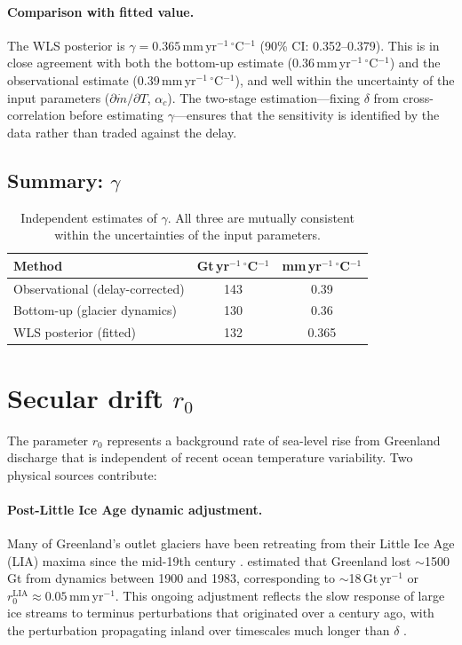 \documentclass[11pt]{article}
\begin{document}
\paragraph{Comparison with fitted value.}
The WLS posterior is $\gamma = 0.365$\,mm\,yr$^{-1}$\,$^\circ$C$^{-1}$ (90\% CI: 0.352--0.379). This is in close agreement with both the bottom-up estimate (0.36\,mm\,yr$^{-1}$\,$^\circ$C$^{-1}$) and the observational estimate (0.39\,mm\,yr$^{-1}$\,$^\circ$C$^{-1}$), and well within the uncertainty of the input parameters ($\partial \dot{m}/\partial T$, $\alpha_c$). The two-stage estimation---fixing $\delta$ from cross-correlation before estimating $\gamma$---ensures that the sensitivity is identified by the data rather than traded against the delay.

\subsection{Summary: $\gamma$}

\begin{table}[h]
\centering
\begin{tabular}{lcc}
\toprule
Method & Gt\,yr$^{-1}$\,$^\circ$C$^{-1}$ & mm\,yr$^{-1}$\,$^\circ$C$^{-1}$ \\
\midrule
Observational (delay-corrected) & 143 & 0.39 \\
Bottom-up (glacier dynamics) & 130 & 0.36 \\
WLS posterior (fitted) & 132 & 0.365 \\
\bottomrule
\end{tabular}
\caption{Independent estimates of $\gamma$. All three are mutually consistent within the uncertainties of the input parameters.}
\label{tab:gamma}
\end{table}


\section{Secular drift $r_0$}
\label{sec:r0}

The parameter $r_0$ represents a background rate of sea-level rise from Greenland discharge that is independent of recent ocean temperature variability. Two physical sources contribute:

\paragraph{Post-Little Ice Age dynamic adjustment.}
Many of Greenland's outlet glaciers have been retreating from their Little Ice Age (LIA) maxima since the mid-19th century \citep{Kjeldsen2015}. \citet{Kjeldsen2015} estimated that Greenland lost $\sim$1500\,Gt from dynamics between 1900 and 1983, corresponding to $\sim$18\,Gt\,yr$^{-1}$ or $r_0^{\mathrm{LIA}} \approx 0.05$\,mm\,yr$^{-1}$. This ongoing adjustment reflects the slow response of large ice streams to terminus perturbations that originated over a century ago, with the perturbation propagating inland over timescales much longer than $\delta$ \citep{Felikson2017}.
\end{document}
